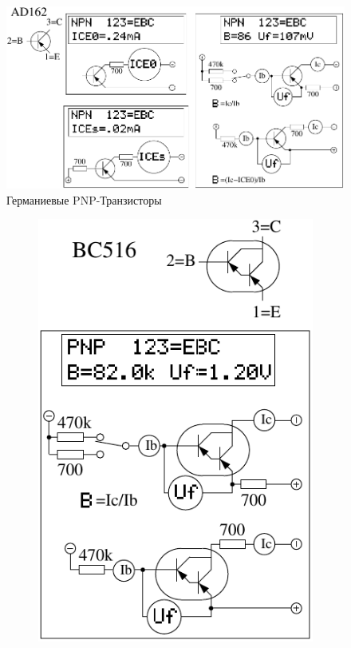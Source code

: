 \begin{figure}[H]
\centering
\includegraphics[width=.8\textwidth]{../FIG/BJT_AD162.pdf}
\caption{Германиевые PNP-Транзисторы}
\label{fig:BJT-PNP-Ge}
\end{figure}

\begin{figure}[H]
  \begin{subfigure}[b]{.5\textwidth}
    \centering
    \includegraphics[width=1.\textwidth]{../FIG/BJT_BC516.pdf}

\end{subfigure}
\end{figure}
